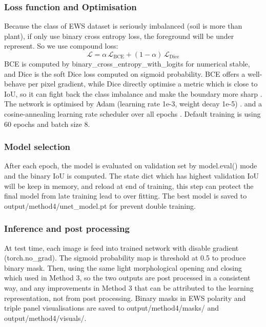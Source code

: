 \documentclass[conference]{IEEEtran}
\begin{document}
\subsubsection{Loss function and Optimisation}
Because the class of EWS dataset is seriously imbalanced (soil is more than plant), if only use binary cross entropy loss, the foreground will be under represent. So we use compound loss:
\begin{equation}
\mathcal{L} = \alpha\,\mathcal{L}_{\mathrm{BCE}} + (1 - \alpha)\,\mathcal{L}_{\mathrm{Dice}}
\end{equation}
BCE is computed by binary\_cross\_entropy\_with\_logits for numerical stable, and Dice is the soft Dice loss computed on sigmoid probability. BCE offers a well-behave per pixel gradient, while Dice directly optimise a metric which is close to IoU, so it can fight back the class imbalance and make the boundary more sharp \cite{vnet}. The network is optimised by Adam (learning rate 1e-3, weight decay 1e-5) \cite{adam}. and a cosine-annealing learning rate scheduler over all epochs \cite{sgdr}. Default training is using 60 epochs and batch size 8.
\subsubsection{Model selection}
After each epoch, the model is evaluated on validation set by model.eval() mode and the binary IoU is computed. The state dict which has highest validation IoU will be keep in memory, and reload at end of training, this step can protect the final model from late training lead to over fitting. The best model is saved to output/method4/unet\_model.pt for prevent double training.
\subsubsection{Inference and post processing}
At test time, each image is feed into trained network with disable gradient (torch.no\_grad). The sigmoid probability map is threshold at 0.5 to produce binary mask. Then, using the same light morphological opening and closing which used in Method 3, so the two outputs are post processed in a consistent way, and any improvements in Method 3 that can be attributed to the learning representation, not from post processing. Binary masks in EWS polarity and triple panel visualisations are saved to output/method4/masks/ and output/method4/visuals/.
\end{document}

